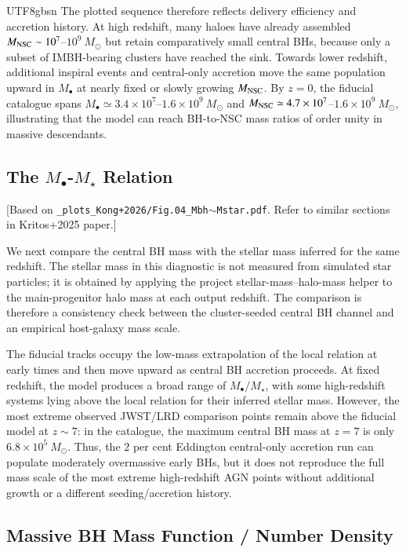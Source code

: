 \documentclass[trackchanges, twocolappendix, twocolumn]{aastex701}
\newcommand{\czkong}[1]{{\color{magenta}#1}}
\begin{document}
\begin{CJK*}{UTF8}{gbsn}
The plotted sequence therefore reflects delivery efficiency and accretion history. At high redshift, many haloes have already assembled $M_{\rm NSC}\sim10^7$--$10^9~M_\odot$ but retain comparatively small central BHs, because only a subset of IMBH-bearing clusters have reached the sink. Towards lower redshift, additional inspiral events and central-only accretion move the same population upward in $M_\bullet$ at nearly fixed or slowly growing $M_{\rm NSC}$. By $z=0$, the fiducial catalogue spans $M_\bullet\simeq3.4\times10^7$--$1.6\times10^9~M_\odot$ and $M_{\rm NSC}\simeq4.7\times10^7$--$1.6\times10^9~M_\odot$, illustrating that the model can reach BH-to-NSC mass ratios of order unity in massive descendants.

\subsection{The $M_\bullet$-$M_\star$ Relation} \label{subsect:Mbh-Mstar}

\czkong{[Based on \texttt{\_plots\_Kong+2026/Fig.04\_Mbh$\sim$Mstar.pdf}. Refer to similar sections in Kritos+2025 paper.]}

We next compare the central BH mass with the stellar mass inferred for the same redshift. The stellar mass in this diagnostic is not measured from simulated star particles; it is obtained by applying the project stellar-mass--halo-mass helper to the main-progenitor halo mass at each output redshift. The comparison is therefore a consistency check between the cluster-seeded central BH channel and an empirical host-galaxy mass scale.

The fiducial tracks occupy the low-mass extrapolation of the local \citet{ReinesVolonteri2015} relation at early times and then move upward as central BH accretion proceeds. At fixed redshift, the model produces a broad range of $M_\bullet/M_\star$, with some high-redshift systems lying above the local relation for their inferred stellar mass. However, the most extreme observed JWST/LRD comparison points remain above the fiducial model at $z\sim7$: in the catalogue, the maximum central BH mass at $z=7$ is only $6.8\times10^5~M_\odot$. Thus, the $2$ per cent Eddington central-only accretion run can populate moderately overmassive early BHs, but it does not reproduce the full mass scale of the most extreme high-redshift AGN points without additional growth or a different seeding/accretion history.

\subsection{Massive BH Mass Function / Number Density} \label{subsect:BHMF}


\end{CJK*}
\end{document}
